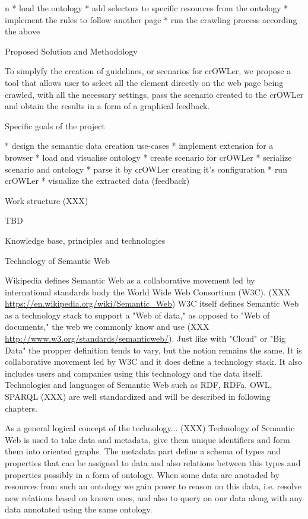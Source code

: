 \begitems \style n
  * load the ontology
  * add selectors to specific resources from the ontology
  * implement the rules to follow another page
  * run the crawling process according the above
\enditems



\sec Proposed Solution and Methodology

To simplyfy the creation of guidelines, or scenarios for crOWLer, we propose a
tool that allows user to select all the element directly on the web page being
crawled, with all the necessary settings, pass the scenario created to the
crOWLer and obtain the results in a form of a graphical feedback. 

\sec Specific goals of the project

\begitems
  * design the semantic data creation use-cases
  * implement extension for a browser
  * load and visualise ontology
  * create scenario for crOWLer 
  * serialize scenario and ontology
  * parse it by crOWLer creating it's configuration
  * run crOWLer
  * visualize the extracted data (feedback)
\enditems


\sec Work structure (XXX)

TBD











\chap Knowledge base, principles and technologies

\sec Technology of Semantic Web

Wikipedia defines Semantic Web as a collaborative movement led by international
standards body the World Wide Web Consortium (W3C).  (XXX
\url{https://en.wikipedia.org/wiki/Semantic_Web}) W3C itself defines Semantic
Web as a technology stack to support a "Web of data," as opposed to "Web of
documents," the web we commonly know and use (XXX
\url{http://www.w3.org/standards/semanticweb/}). Just like with "Cloud" or "Big
Data" the propper definition tends to vary, but the notion remains the same.
It is collaborative movement led by W3C and it does define a technology stack.
It also includes users and companies using this technology and the data itself. 
Technologies and languages of Semantic Web such as RDF, RDFa, OWL, SPARQL (XXX)
are well standardized and will be described in following chapters. 

As a general logical concept of the technology... (XXX) Technology of Semantic
Web is used to take data and metadata, give them unique identifiers and form
them into oriented graphs. The metadata part define a schema of types and
properties that can be assigned to data and also relations between this types
and properties possibly in a form of ontology. When some data are anotaded by
resources from such an ontology we gain power to reason on this data, i.e.
resolve new relations based on known ones, and also to query on our data along
with any data annotated using the same ontology. 

